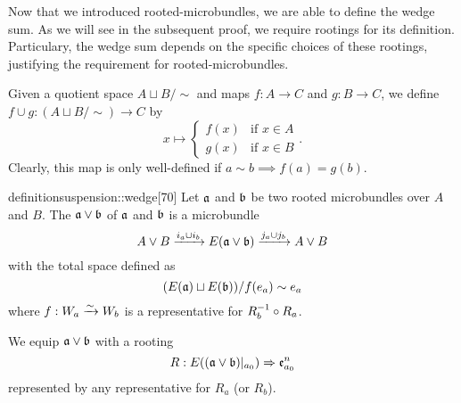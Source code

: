 \begin{myparagraph}
    Now that we introduced rooted-microbundles,
    we are able to define the wedge sum.
    As we will see in the subsequent proof,
    we require rootings for its definition.
    Particulary, the wedge sum depends on the specific choices of these rootings,
    justifying the requirement for rooted-microbundles.

    Given a quotient space $A \sqcup B / \sim$ and maps $f: A \to C$ and $g: B \to C$, we define
    $f \cup g: (A \sqcup B / \sim) \to C$ by
    \[ x \mapsto \begin{cases} f(x) & \text{if } x \in A \\ g(x) &\text{if } x \in B \end{cases}.\]
    Clearly, this map is only well-defined if $a \sim b \implies f(a) = g(b)$.
\end{myparagraph}

\begin{mystatement}{definition}{suspension::wedge}[70] %
    Let $\mathfrak{a}$ and $\bb$ be two rooted microbundles over $A$ and $B$.
    The  $\ba \vee \bb$ of $\mathfrak{a}$ and $\bb$ is a microbundle
    \[ A \vee B \xto{i_a \cup i_b} E(\ba \vee \bb) \xto{j_a \cup j_b} A \vee B \]
    with the total space defined as
    \[ (E(\ba) \sqcup E(\bb)) / f(e_a) \sim e_a \]
    where $f: W_a \xrightarrow{\sim} W_b$ is a representative for $R_b^{-1} \circ R_a$.
    
    We equip $\ba \vee \bb$ with a rooting
    \[ \germdef{R}{E((\ba \vee \bb)\restr{a_0})}{\be{a_0}} \]
    represented by any representative for $R_a$ (or $R_b$).
\end{mystatement}

